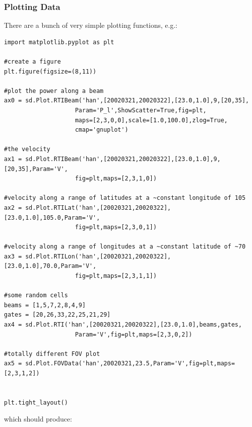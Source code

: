 			\subsubsection{Plotting Data}
			
				There are a bunch of very simple plotting functions, e.g.:
			
				\begin{verbatim}
import matplotlib.pyplot as plt
			
#create a figure
plt.figure(figsize=(8,11))
			
#plot the power along a beam
ax0 = sd.Plot.RTIBeam('han',[20020321,20020322],[23.0,1.0],9,[20,35],
					Param='P_l',ShowScatter=True,fig=plt,
					maps=[2,3,0,0],scale=[1.0,100.0],zlog=True,
					cmap='gnuplot')
			
#the velocity
ax1 = sd.Plot.RTIBeam('han',[20020321,20020322],[23.0,1.0],9,[20,35],Param='V',
					fig=plt,maps=[2,3,1,0])
			
#velocity along a range of latitudes at a ~constant longitude of 105
ax2 = sd.Plot.RTILat('han',[20020321,20020322],[23.0,1.0],105.0,Param='V',
					fig=plt,maps=[2,3,0,1])
		
#velocity along a range of longitudes at a ~constant latitude of ~70
ax3 = sd.Plot.RTILon('han',[20020321,20020322],[23.0,1.0],70.0,Param='V',
					fig=plt,maps=[2,3,1,1])
			
#some random cells
beams = [1,5,7,2,8,4,9]
gates = [20,26,33,22,25,21,29]
ax4 = sd.Plot.RTI('han',[20020321,20020322],[23.0,1.0],beams,gates,
					Param='V',fig=plt,maps=[2,3,0,2])
			
#totally different FOV plot
ax5 = sd.Plot.FOVData('han',20020321,23.5,Param='V',fig=plt,maps=[2,3,1,2])
			
			
plt.tight_layout()
				\end{verbatim}
			
				which should produce:
			

